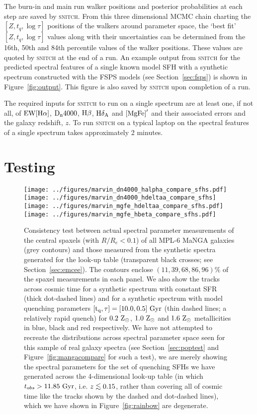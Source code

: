 \documentclass[useAMS,usenatbib]{mn2e}
\def\lesssim{\mathrel{\hbox{\rlap{\hbox{\lower3pt\hbox{$\sim$}}}\hbox{\raise2pt\hbox{$<$}}}}}
\begin{document}
The burn-in and main run walker positions and posterior probabilities at each step are saved by \textsc{snitch}. From this three dimensional MCMC chain charting the $[Z, t_q, \log \tau]$ positions of the walkers around parameter space, the `best fit' $[Z, t_q, \log \tau]$ values along with their uncertainties can be determined from the 16th, 50th and 84th percentile values of the walker positions. These values are quoted by \textsc{snitch} at the end of a run. An example output from \textsc{snitch} for the predicted spectral features of a single known model SFH with a synthetic spectrum constructed with the FSPS models (see Section~\ref{sec:fsps}) is shown in Figure~\ref{fig:output}. This figure is also saved by \textsc{snitch} upon completion of a run.  


The required inputs for \textsc{snitch} to run on a single spectrum are at least one, if not all, of $\rm{EW}[H\alpha]$, $\rm{D}_n4000$, $\rm{H}\beta$, $\rm{H}\delta_A$ and $\rm{[MgFe]}^{\prime}$ and their associated errors and the galaxy redshift, $z$. To run \textsc{snitch} on a typical laptop on the spectral features of a single spectrum takes approximately 2 minutes. 

\section{Testing}\label{sec:test}

\begin{figure*}
\centering
\texttt{[image: ../figures/marvin\_dn4000\_halpha\_compare\_sfhs.pdf]}
\texttt{[image: ../figures/marvin\_dn4000\_hdeltaa\_compare\_sfhs]}
\texttt{[image: ../figures/marvin\_mgfe\_hdeltaa\_compare\_sfhs.pdf]}
\texttt{[image: ../figures/marvin\_mgfe\_hbeta\_compare\_sfhs.pdf]}
\caption{Consistency test between actual spectral parameter measurements of the central spaxels (with $R/R_e < 0.1$) of all MPL-6 MaNGA galaxies (grey contours) and those measured from the synthetic spectra generated for the look-up table (transparent black crosses; see Section~\ref{sec:emcee}). The contours enclose $(11, 39, 68, 86, 96)\%$ of the spaxel measurements in each panel. We also show the tracks across cosmic time for a synthetic spectrum with constant SFR (thick dot-dashed lines) and for a synthetic spectrum with model quenching parameters $[\rm{t}_q, \tau] = [10.0, 0.5]~\rm{Gyr}$ (thin dashed lines; a relatively rapid quench) for $0.2~\rm{Z}_{\odot}$, $1.0~\rm{Z}_{\odot}$ and $1.6~\rm{Z}_{\odot}$ metallicities in blue, black and red respectively. We have not attempted to recreate the distributions across spectral parameter space seen for this sample of real galaxy spectra (see Section~\ref{sec:poptest} and Figure~\ref{fig:mangacompare} for such a test), we are merely showing the spectral parameters for the set of quenching SFHs we have generated across the 4-dimensional look-up table (in which $t_{obs} > 11.85~\rm{Gyr}$, i.e. $z \lesssim 0.15$, rather than covering all of cosmic time like the tracks shown by the dashed and dot-dashed lines), which we have shown in Figure~\ref{fig:rainbow} are degenerate.}
\label{fig:compare_manga_specmeas}
\end{figure*}
\end{document}
